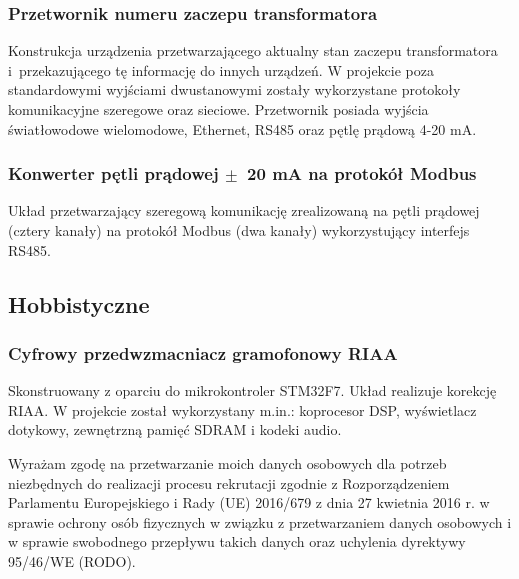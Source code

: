 \documentclass[letterpaper]{template/twentysecondcv} %
\begin{document}
\subsubsection*{Przetwornik numeru zaczepu transformatora}
Konstrukcja urządzenia przetwarzającego aktualny stan zaczepu transformatora\\ i~przekazującego tę informację do innych urządzeń. W projekcie poza standardowymi wyjściami dwustanowymi zostały wykorzystane protokoły komunikacyjne szeregowe oraz sieciowe. Przetwornik posiada wyjścia światłowodowe wielomodowe, Ethernet, RS485 oraz pętlę prądową 4-20 mA.

\subsubsection*{Konwerter pętli prądowej $\pm$~20 mA na protokół Modbus}
Układ przetwarzający szeregową komunikację zrealizowaną na pętli prądowej (cztery kanały) na protokół Modbus (dwa kanały) wykorzystujący interfejs RS485.

\subsection{Hobbistyczne}
\vspace{-0.25cm}
\subsubsection*{Cyfrowy przedwzmacniacz gramofonowy RIAA}
Skonstruowany z oparciu do mikrokontroler STM32F7. Układ realizuje korekcję RIAA. W projekcie został wykorzystany m.in.: koprocesor DSP, wyświetlacz dotykowy, zewnętrzną pamięć SDRAM i kodeki audio. 



%

\vspace{0.9cm}
\tiny{Wyrażam zgodę na przetwarzanie moich danych osobowych dla potrzeb niezbędnych do realizacji procesu rekrutacji zgodnie z Rozporządzeniem Parlamentu Europejskiego i Rady (UE) 2016/679 z dnia 27 kwietnia 2016 r. w sprawie ochrony osób fizycznych w związku z przetwarzaniem danych osobowych i w sprawie swobodnego przepływu takich danych oraz uchylenia dyrektywy 95/46/WE (RODO).}
\end{document}

